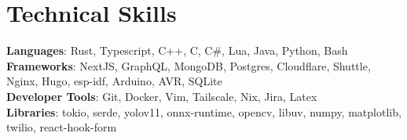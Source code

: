 \documentclass[letterpaper,11pt]{article}
\begin{document}
%
\section{Technical Skills}
 \begin{itemize}[leftmargin=0.15in, label={}]
    \small{\item{
     \textbf{Languages}{: Rust, Typescript, C++, C, C\#, Lua, Java, Python, Bash} \\
     \textbf{Frameworks}{: NextJS, GraphQL, MongoDB, Postgres, Cloudflare, Shuttle, Nginx, Hugo, esp-idf, Arduino, AVR, SQLite} \\
     \textbf{Developer Tools}{: Git, Docker, Vim, Tailscale, Nix, Jira, Latex } \\
     \textbf{Libraries}{: tokio, serde, yolov11, onnx-runtime, opencv, libuv, numpy, matplotlib, twilio, react-hook-form}
    }}
 \end{itemize}

\end{document}
